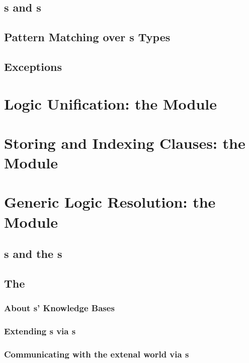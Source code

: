 \documentclass[presentation]{beamer}
\begin{document}
\subsection{s and s}

\subsection{Pattern Matching over s Types}

\subsection{Exceptions}

\section{Logic Unification: the  Module}

\section{Storing and Indexing Clauses: the  Module}

\section{Generic Logic Resolution: the  Module}

\subsection{s and the s}

\subsection{The }

\subsubsection{About s' Knowledge Bases}

\subsubsection{Extending s via s}

\subsubsection{Communicating with the extenal world via s}
\end{document}
